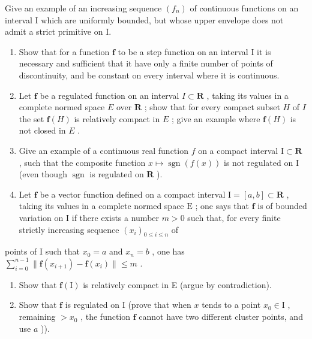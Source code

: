 Give an example of an increasing sequence \((f_n)\) of continuous functions on an interval I which are uniformly bounded, but whose upper envelope does not admit a strict primitive on I.

\begin{enumerate}
\def\labelenumi{\arabic{enumi})}
\setcounter{enumi}{1}
\item
  Show that for a function \(\mathbf{f}\) to be a step function on an interval I it is necessary and sufficient that it have only a finite number of points of discontinuity, and be constant on every interval where it is continuous.
\item
  Let \(\mathbf{f}\) be a regulated function on an interval \(I \subset \mathbf{R}\) , taking its values in a complete normed space \(E\) over \(\mathbf{R}\) ; show that for every compact subset \(H\) of \(I\) the set \(\mathbf{f}(H)\) is relatively compact in \(E\) ; give an example where \(\mathbf{f}(H)\) is not closed in \(E\) .
\item
  Give an example of a continuous real function \(f\) on a compact interval \(\mathrm{I} \subset \mathbf{R}\) , such that the composite function \(x \mapsto \operatorname{sgn}(f(x))\) is not regulated on \(\mathrm{I}\) (even though \(\operatorname{sgn}\) is regulated on \(\mathbf{R}\) ).
\item
  Let \(\mathbf{f}\) be a vector function defined on a compact interval \(\mathrm{I} = [a, b] \subset \mathbf{R}\) , taking its values in a complete normed space \(\mathrm{E}\) ; one says that \(\mathbf{f}\) is of bounded variation on \(\mathrm{I}\) if there exists a number \(m > 0\) such that, for every finite strictly increasing sequence \((x_i)_{0 \leqslant i \leqslant n}\) of
\end{enumerate}

points of I such that \(x_0 = a\) and \(x_n = b\) , one has \(\sum_{i=0}^{n-1} \| \mathbf{f}(x_{i+1}) - \mathbf{f}(x_i) \| \leqslant m\) .

\begin{enumerate}
\def\labelenumi{\alph{enumi})}
\item
  Show that \(\mathbf{f}(\mathrm{I})\) is relatively compact in E (argue by contradiction).
\item
  Show that \(\mathbf{f}\) is regulated on I (prove that when \(x\) tends to a point \(x_0 \in \mathrm{I}\) , remaining \(>x_0\) , the function \(\mathbf{f}\) cannot have two different cluster points, and use \(a\) )).
\end{enumerate}

